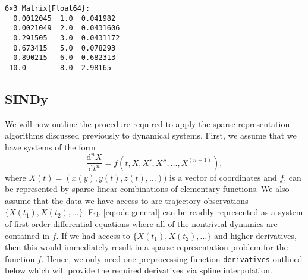\documentclass[
]{article}
\begin{document}
\begin{verbatim}
6×3 Matrix{Float64}:
  0.0012045  1.0  0.041982
  0.0021049  2.0  0.0431606
  0.291505   3.0  0.0431172
  0.673415   5.0  0.078293
  0.890215   6.0  0.682313
 10.0        8.0  2.98165
\end{verbatim}

\subsection{SINDy}\label{sindy}

We will now outline the procedure required to apply the sparse
representation algorithms discussed previously to dynamical systems.
First, we assume that we have systems of the form
\begin{equation} \label{eq:ode-general}
\frac{\text{d}^n X}{\text{d}t^n} = f(t, X,  X', X'', \dots, X^{(n - 1)}),
\end{equation} where \(X(t) = (x(y), y(t), z(t),  \dots))\) is a vector
of coordinates and \(f\), can be represented by sparse linear
combinations of elementary functions. We also assume that the data we
have access to are trajectory observations
\(\{X(t_1), X(t_2), \dots \}\). Eq. \eqref{eq:ode-general} can be
readily represented as a system of first order differential equations
where all of the nontrivial dynamics are contained in \(f\). If we had
access to \(\{\dot{X}(t_1), \dot{X}(t_2), \dots \}\) and higher
derivatives, then this would immediately result in a sparse
representation problem for the function \(f\). Hence, we only need one
preprocessing function \texttt{derivatives} outlined below which will
provide the required derivatives via spline interpolation.
\end{document}
